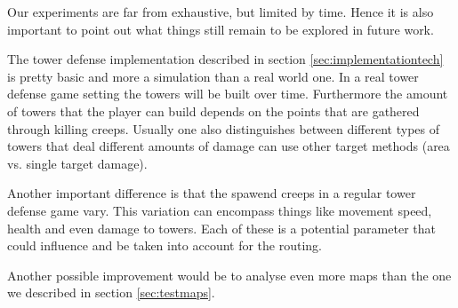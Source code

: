 Our experiments are far from exhaustive, but limited by time. Hence it is also important to point out what things still remain to be explored in future work.

The tower defense implementation described in section \ref{sec:implementationtech} is pretty basic and more a simulation than a real world one.
In a real tower defense game setting the towers will be built over time.  Furthermore the amount of towers that the player can build depends on the points that are gathered through killing creeps.
Usually one also distinguishes between different types of towers that deal different amounts of damage can use other target methods (area vs. single target damage)\cite[P. 57]{hernandez2015mathematics}.

Another important difference is that the spawend creeps in a regular tower defense game vary. This variation can encompass things like movement speed, health and even damage to towers\cite[P. 57]{hernandez2015mathematics}. Each of these is a potential parameter that could influence and be taken into account for the routing.

Another possible improvement would be to analyse even more maps than the one we described in section \ref{sec:testmaps}.

